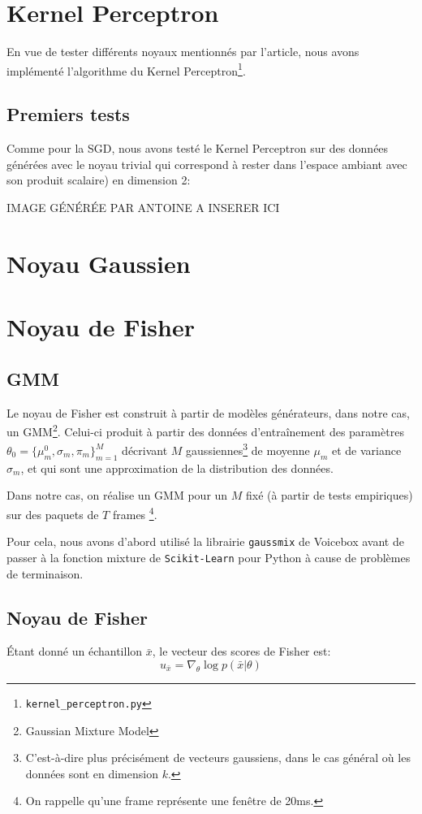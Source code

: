 \documentclass{article}
\begin{document}
\section{Kernel Perceptron}
\label{kernelperceptron}
En vue de tester différents noyaux mentionnés par l'article, nous avons implémenté l'algorithme du Kernel Perceptron\footnote{\texttt{kernel\_perceptron.py}}.

\subsection{Premiers tests}
Comme pour la SGD, nous avons testé le Kernel Perceptron sur des données générées avec le noyau trivial qui correspond à rester dans l'espace ambiant avec son produit scalaire) en dimension 2:

IMAGE GÉNÉRÉE PAR ANTOINE A INSERER ICI


\section{Noyau Gaussien}
\label{gaussien}
\section{Noyau de Fisher}
\label{fisher}
\subsection{GMM}
Le noyau de Fisher est construit à partir de modèles générateurs, dans notre cas, un GMM\footnote{Gaussian Mixture Model}.
Celui-ci produit à partir des données d'entraînement des paramètres $\theta_0 = \lbrace \mu_m^0, \sigma_m, \pi_m \rbrace_{m=1}^M$ décrivant $M$ gaussiennes\footnote{C'est-à-dire plus précisément de vecteurs gaussiens, dans le cas général où les données sont en dimension $k$.} de moyenne $\mu_m$ et de variance $\sigma_m$, et qui sont une approximation de la distribution des données.

Dans notre cas, on réalise un GMM pour un $M$ fixé (à partir de tests empiriques) sur des paquets de $T$ \og frames \fg \footnote{On rappelle qu'une frame représente une fenêtre de 20ms.}.

Pour cela, nous avons d'abord utilisé la librairie \texttt{gaussmix} de Voicebox avant de passer à la fonction mixture de \texttt{Scikit-Learn} pour Python à cause de problèmes de terminaison.
\subsection{Noyau de Fisher}
Étant donné un échantillon $\bar{x}$, le vecteur des scores de Fisher est:
\[u_{\bar{x}} = \nabla_{\theta} \log p (\bar{x} | \theta) \]
\end{document}

